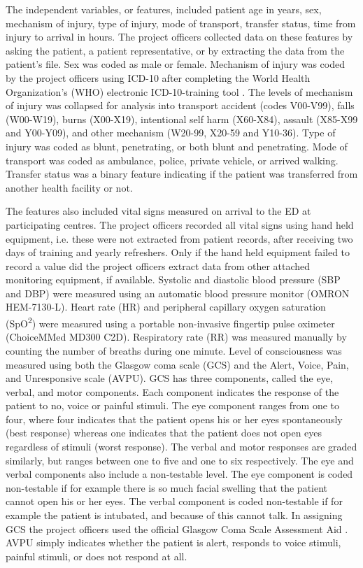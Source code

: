 \documentclass[10pt,letterpaper]{article}\usepackage[]{graphicx}\usepackage[]{color}
\begin{document}
The independent variables, or features, included patient age in years, sex,
mechanism of injury, type of injury, mode of transport, transfer status, time
from injury to arrival in hours. The project officers collected data on these
features by asking the patient, a patient representative, or by extracting the
data from the patient's file. Sex was coded as male or female. Mechanism of
injury was coded by the project officers using ICD-10 after completing the World
Health Organization's (WHO) electronic ICD-10-training tool \cite{WHOICD}. The
levels of mechanism of injury was collapsed for analysis into transport accident
(codes V00-V99), falls (W00-W19), burns (X00-X19), intentional self harm
(X60-X84), assault (X85-X99 and Y00-Y09), and other mechanism (W20-99, X20-59
and Y10-36). Type of injury was coded as blunt, penetrating, or both blunt and
penetrating. Mode of transport was coded as ambulance, police, private vehicle,
or arrived walking. Transfer status was a binary feature indicating if the
patient was transferred from another health facility or not.

The features also included vital signs measured on arrival to the ED at
participating centres. The project officers recorded all vital signs using hand
held equipment, i.e. these were not extracted from patient records, after
receiving two days of training and yearly refreshers. Only if the hand held
equipment failed to record a value did the project officers extract data from
other attached monitoring equipment, if available. Systolic and diastolic blood
pressure (SBP and DBP) were measured using an automatic blood pressure monitor
(OMRON HEM-7130-L). Heart rate (HR) and peripheral capillary oxygen saturation
(SpO\textsuperscript{2}) were measured using a portable non-invasive fingertip
pulse oximeter (ChoiceMMed MD300 C2D). Respiratory rate (RR) was measured
manually by counting the number of breaths during one minute. Level of
consciousness was measured using both the Glasgow coma scale (GCS) and the
Alert, Voice, Pain, and Unresponsive scale (AVPU). GCS has three components,
called the eye, verbal, and motor components. Each component indicates the
response of the patient to no, voice or painful stimuli. The eye component
ranges from one to four, where four indicates that the patient opens his or her
eyes spontaneously (best response) whereas one indicates that the patient does
not open eyes regardless of stimuli (worst response). The verbal and motor
responses are graded similarly, but ranges between one to five and one to six
respectively. The eye and verbal components also include a non-testable
level. The eye component is coded non-testable if for example there is so much
facial swelling that the patient cannot open his or her eyes. The verbal
component is coded non-testable if for example the patient is intubated, and
because of this cannot talk. In assigning GCS the project officers used the
official Glasgow Coma Scale Assessment Aid \cite{GCSAID}. AVPU simply indicates
whether the patient is alert, responds to voice stimuli, painful stimuli, or
does not respond at all.
\end{document}
